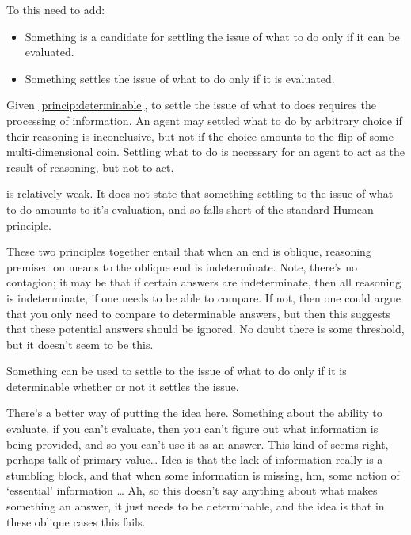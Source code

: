 \documentclass[10pt]{article}
\begin{document}
To this need to add:
\begin{principle}\label{princip:determinable}
  \begin{itemize}
  \item Something is a candidate for settling the issue of what to do only if it can be evaluated.
  \item Something settles the issue of what to do only if it is evaluated.
  \end{itemize}

\end{principle}
Given \autoref{princip:determinable}, to settle the issue of what to does requires the processing of information.
An agent may settled what to do by arbitrary choice if their reasoning is inconclusive, but not if the choice amounts to the flip of some multi-dimensional coin.
Settling what to do is necessary for an agent to act as the result of reasoning, but not to act.


is relatively weak.
It does not state that something settling to the issue of what to do amounts to it's evaluation, and so falls short of the standard Humean principle.



These two principles together entail that when an end is oblique, reasoning premised on means to the oblique end is indeterminate.
Note, there's no contagion; it may be that if certain answers are indeterminate, then all reasoning is indeterminate, if one needs to be able to compare.
If not, then one could argue that you only need to compare to determinable answers, but then this suggests that these potential answers should be ignored.
No doubt there is some threshold, but it doesn't seem to be this.

\begin{principle}
  Something can be used to settle to the issue of what to do only if it is determinable whether or not it settles the issue.
\end{principle}
There's a better way of putting the idea here.
Something about the ability to evaluate, if you can't evaluate, then you can't figure out what information is being provided, and so you can't use it as an answer.
This kind of seems right, perhaps talk of primary value\dots
Idea is that the lack of information really is a stumbling block, and that when some information is missing, hm, some notion of `essential' information \dots
Ah, so this doesn't say anything about what makes something an answer, it just needs to be determinable, and the idea is that in these oblique cases this fails.
\end{document}

